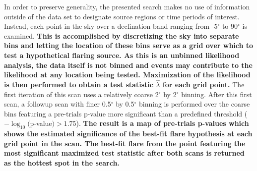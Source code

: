 \documentclass[manuscript]{aastex}
\begin{document}
In order to preserve generality, the presented search makes no use of information outside of the data set to designate source regions or time periods of interest. Instead, each point in the sky over a declination band ranging from -5$^{\circ}$ to 90$^{\circ}$ is examined. \textbf{This is accomplished by discretizing the sky into separate bins and letting the location of these bins serve as a grid over which to test a hypothetical flaring source. As this is an unbinned likelihood analysis, the data itself is not binned and events may contribute to the likelihood at any location being tested. Maximization of the likelihood is then performed to obtain a test statistic $\hat{\lambda}$ for each grid point.} The first iteration of this scan uses a relatively coarse 2$^{\circ}$ by 2$^{\circ}$ binning. After this first scan, a followup scan with finer 0.5$^{\circ}$ by 0.5$^{\circ}$ binning is performed over the coarse bins featuring a pre-trials p-value more significant than a predefined threshold ($-\log_{10}($p-value$) > 1.75$). \textbf{The result is a map of pre-trials p-values which shows the estimated significance of the best-fit flare hypothesis at each grid point in the scan. The best-fit flare from the point featuring the most significant maximized test statistic after both scans is returned as the hottest spot in the search.}
\end{document}
